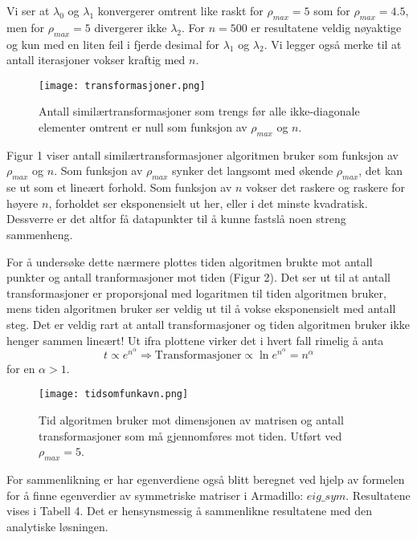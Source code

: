 \documentclass[norsk, 12pt]{article}
\begin{document}
Vi ser at $\lambda_0$ og $\lambda_1$ konvergerer omtrent like raskt for $\rho_{max}=5$ som for $\rho_{max}=4.5$, men
for $\rho_{max}=5$ divergerer ikke $\lambda_2$. For $n=500$ er resultatene veldig nøyaktige og kun med en liten feil i
fjerde desimal for $\lambda_1$ og $\lambda_2$. Vi legger også merke til at antall iterasjoner vokser kraftig med $n$.

\begin{figure}
 \centering
 \texttt{[image: transformasjoner.png]}
 \caption{Antall similærtransformasjoner som trengs før alle ikke-diagonale elementer omtrent er null som funksjon av
 $\rho_{max}$ og $n$.}
\end{figure}

Figur 1 viser antall similærtransformasjoner algoritmen bruker som funksjon av $\rho_{max}$ og $n$. Som funksjon av $\rho_{max}$
synker det langsomt med økende $\rho_{max}$, det kan se ut som et lineært forhold. Som funksjon av $n$ vokser det 
raskere og raskere for høyere $n$, forholdet ser eksponensielt ut her, eller i det minste kvadratisk. Dessverre er det altfor få datapunkter til å kunne
fastslå noen streng sammenheng.

For å undersøke dette nærmere plottes tiden algoritmen brukte mot antall punkter og antall tranformasjoner mot tiden
(Figur 2). Det ser ut til at antall transformasjoner er proporsjonal med logaritmen til tiden algoritmen bruker, mens
tiden algoritmen bruker ser veldig ut til å vokse eksponensielt med antall steg. Det er veldig rart at antall
transformasjoner og tiden algoritmen bruker ikke henger sammen lineært! Ut ifra plottene virker det i hvert fall
rimelig å anta
$$t\propto e^{n^\alpha}\Rightarrow \text{Transformasjoner} \propto \ln e^{n^\alpha} = n^\alpha $$
for en $\alpha>1$.

\begin{figure}
 \centering
 \texttt{[image: tidsomfunkavn.png]}
 \caption{Tid algoritmen bruker mot dimensjonen av matrisen og antall transformasjoner som må gjennomføres mot tiden. Utført ved
$\rho_{max}=5$.}
\end{figure}

For sammenlikning er har egenverdiene også blitt beregnet ved hjelp av formelen for å finne egenverdier av symmetriske matriser
i Armadillo: $eig\_sym$. Resultatene vises i Tabell 4. Det er hensynsmessig å sammenlikne resultatene med den analytiske løsningen.
\end{document}
